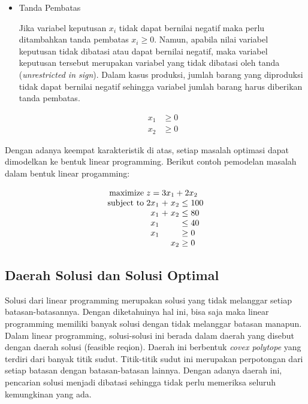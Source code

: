 \begin{itemize}
	\item Tanda Pembatas
		
		Jika variabel keputusan \(x_i\) tidak dapat bernilai negatif maka perlu ditambahkan tanda pembatas \(x_i \geq 0\). Namun, apabila nilai variabel keputusan tidak dibatasi atau dapat bernilai negatif, maka variabel keputusan tersebut merupakan variabel yang tidak dibatasi oleh tanda (\textit{unrestricted in sign}). Dalam kasus produksi, jumlah barang yang diproduksi tidak dapat bernilai negatif sehingga variabel jumlah barang harus diberikan tanda pembatas.
		
		\begin{equation*}
			\begin{split}
    			x_1 &\geq 0 \\
    			x_2 &\geq 0
			\end{split}
		\end{equation*}
		
\end{itemize}

Dengan adanya keempat karakteristik di atas, setiap masalah optimasi dapat dimodelkan ke bentuk linear programming. Berikut contoh pemodelan masalah dalam bentuk linear progamming:

\begin{equation*}
	\setlength\arraycolsep{1.5pt}
	\begin{array}{r r c r c l}
		\text{maximize} &\multicolumn{5}{l}{z = 3x_1 + 2x_2}\\
		\text{subject to} &2x_1 &+ &x_2 &\leq &100\\
		&x_1 &+ &x_2 &\leq &80\\
		&x_1 &&&\leq &40\\
		&x_1 &&&\geq &0\\
		&&&x_2 &\geq &0\\
	\end{array}
\end{equation*}

\subsection{Daerah Solusi dan Solusi Optimal}
\label{daerah_solusi_dan_solusi_optimal}

Solusi dari linear programming merupakan solusi yang tidak melanggar setiap batasan-batasannya. Dengan diketahuinya hal ini, bisa saja maka linear programming memiliki banyak solusi dengan tidak melanggar batasan manapun. Dalam linear programming, solusi-solusi ini berada dalam daerah yang disebut dengan daerah solusi (feasible reqion). Daerah ini berbentuk \textit{covex polytope} yang terdiri dari banyak titik sudut. Titik-titik sudut ini merupakan perpotongan dari setiap batasan dengan batasan-batasan lainnya. Dengan adanya daerah ini, pencarian solusi menjadi dibatasi sehingga tidak perlu memeriksa seluruh kemungkinan yang ada. 

